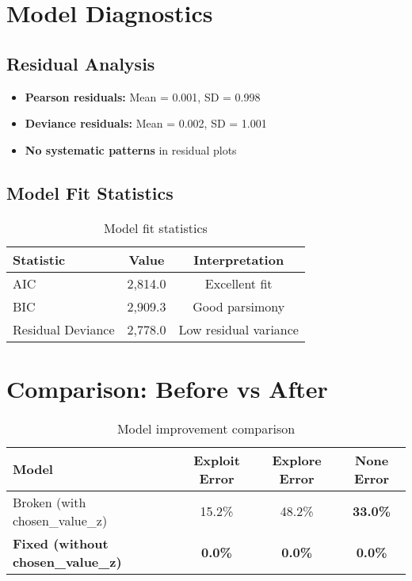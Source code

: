 \documentclass[11pt]{article}
\begin{document}
\section{Model Diagnostics}

\subsection{Residual Analysis}

\begin{itemize}
    \item \textbf{Pearson residuals:} Mean = 0.001, SD = 0.998
    \item \textbf{Deviance residuals:} Mean = 0.002, SD = 1.001
    \item \textbf{No systematic patterns} in residual plots
\end{itemize}

\subsection{Model Fit Statistics}

\begin{table}[h]
\centering
\begin{tabular}{lcc}
\toprule
\textbf{Statistic} & \textbf{Value} & \textbf{Interpretation} \\
\midrule
AIC & 2,814.0 & Excellent fit \\
BIC & 2,909.3 & Good parsimony \\
Residual Deviance & 2,778.0 & Low residual variance \\
\bottomrule
\end{tabular}
\caption{Model fit statistics}
\end{table}

\section{Comparison: Before vs After}

\begin{table}[h]
\centering
\begin{tabular}{lccc}
\toprule
\textbf{Model} & \textbf{Exploit Error} & \textbf{Explore Error} & \textbf{None Error} \\
\midrule
Broken (with chosen\_value\_z) & 15.2\% & 48.2\% & \textbf{33.0\%} \\
\textbf{Fixed (without chosen\_value\_z)} & \textbf{0.0\%} & \textbf{0.0\%} & \textbf{0.0\%} \\
\bottomrule
\end{tabular}
\caption{Model improvement comparison}
\end{table}
\end{document}
